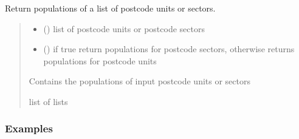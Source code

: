 \documentclass[letterpaper,10pt,english]{sphinxmanual}
\begin{document}
\begin{fulllineitems}
\begin{fulllineitems}
\label{\detokenize{index:locator.PostcodeLocator.get_population_of_postcode}}
\pysigstartsignatures
{}
\pysigstopsignatures
\sphinxAtStartPar
Return populations of a list of postcode units or sectors.
\begin{quote}\begin{description}
\begin{itemize}
\item {} 
\sphinxAtStartPar
{} () \textendash{} list of postcode units or postcode sectors

\item {} 
\sphinxAtStartPar
{} (\sphinxstyleliteralemphasis{\sphinxupquote{, }}) \textendash{} if true return populations for postcode sectors,
otherwise returns populations for postcode units

\end{itemize}

\sphinxAtStartPar
Contains the populations of input postcode units or sectors

\sphinxAtStartPar
list of lists

\end{description}\end{quote}
\subsubsection*{Examples}


\end{fulllineitems}
\end{fulllineitems}
\end{document}
